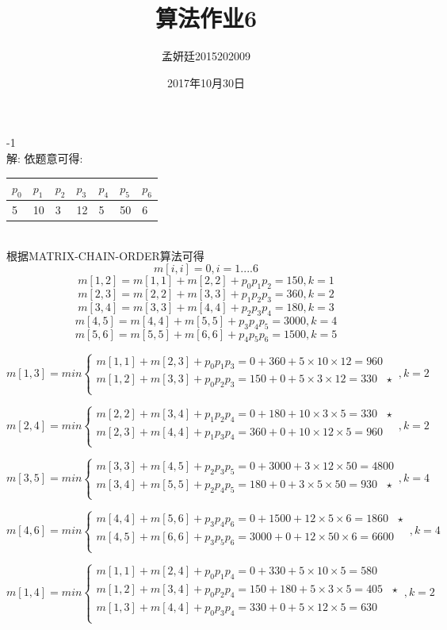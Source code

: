 \documentclass[19pt,a4paper]{article}
\title{算法作业6}
\author{孟妍廷2015202009}
\date{2017年10月30日}
\begin{document}
-1\\
\indent 解: 依题意可得:
\begin{table}[h]
\centering
\begin{tabular*}{6cm}{lllllll}
\hline
$p_0$ & $p_1$ & $p_2$ & $p_3$ & $p_4$ & $p_5$ & $p_6$ \\
\hline
5 & 10 & 3 & 12 & 5 & 50 & 6 \\
\hline
\end{tabular*}
\end{table}\\
\indent 根据MATRIX-CHAIN-ORDER算法可得
$$m[i,i]=0,i=1....6$$
$$m[1,2]=m[1,1]+m[2,2]+p_0p_1p_2=150,k=1$$
$$m[2,3]=m[2,2]+m[3,3]+p_1p_2p_3=360,k=2$$
$$m[3,4]=m[3,3]+m[4,4]+p_2p_3p_4=180,k=3$$
$$m[4,5]=m[4,4]+m[5,5]+p_3p_4p_5=3000,k=4$$
$$m[5,6]=m[5,5]+m[6,6]+p_4p_5p_6=1500,k=5$$

$$m[1,3]=min\left\{
\begin{aligned}
m[1,1]+m[2,3]+p_0p_1p_3=0+360+5\times10\times12=960 \\
m[1,2]+m[3,3]+p_0p_2p_3=150+0+5\times3\times12=330 \ \ \ \star\\
\end{aligned}
\right.,k=2$$

$$m[2,4]=min\left\{
\begin{aligned}
m[2,2]+m[3,4]+p_1p_2p_4=0+180+10\times3\times5=330 \ \ \ \star \\
m[2,3]+m[4,4]+p_1p_3p_4=360+0+10\times12\times5=960 \\
\end{aligned}
\right.,k=2$$

$$m[3,5]=min\left\{
\begin{aligned}
m[3,3]+m[4,5]+p_2p_3p_5=0+3000+3\times12\times50=4800\\
m[3,4]+m[5,5]+p_2p_4p_5=180+0+3\times5\times50=930 \ \ \ \star\\
\end{aligned}
\right.,k=4$$

$$m[4,6]=min\left\{
\begin{aligned}
m[4,4]+m[5,6]+p_3p_4p_6=0+1500+12\times5\times6=1860 \ \ \ \star\\
m[4,5]+m[6,6]+p_3p_5p_6=3000+0+12\times50\times6=6600 \\
\end{aligned}
\right.,k=4$$

$$m[1,4]=min\left\{
\begin{aligned}
m[1,1]+m[2,4]+p_0p_1p_4=0+330+5\times10\times5=580\\
m[1,2]+m[3,4]+p_0p_2p_4=150+180+5\times3\times5=405 \ \ \ \star\\
m[1,3]+m[4,4]+p_0p_3p_4=330+0+5\times12\times5=630 \\
\end{aligned}
\right.,k=2$$
\end{document}
